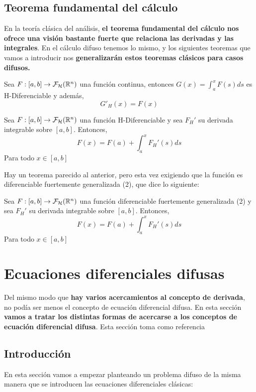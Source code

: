 \subsection{Teorema fundamental del cálculo}
En la teoría clásica del análisis, \textbf{el teorema fundamental del cálculo nos ofrece una visión bastante fuerte que relaciona las derivadas y las integrales}. En el cálculo difuso tenemos lo mismo, y los siguientes teoremas que vamos a introducir nos \textbf{generalizarán estos teoremas clásicos para casos difusos.}

\begin{teorema}
  Sea $F : [a, b] \rightarrow \mathcal{F}_\mathcal{H} (\mathbb R^n)$ una función continua, entonces $G(x) = \int_{a}^{x} F(s) ds$ es H-Diferenciable y además,
  \[
  G'_H(x) = F(x)
  \]
\end{teorema}

\begin{teorema}
  Sea $F : [a, b] \rightarrow  \mathcal{F}_\mathcal{H} (\mathbb R^n)$ una función H-Diferenciable y sea $F_H'$ su derivada integrable sobre $[a, b]$. Entonces,
  \[
  F(x) = F(a) + \int_{a}^{x}F_H'(s) ds
  \]
  Para todo $x \in [a, b]$
\end{teorema}

Hay un teorema parecido al anterior, pero esta vez exigiendo que la función es diferenciable fuertemente generalizada (2), que dice lo siguiente:

\begin{teorema}
  Sea $F : [a, b] \rightarrow  \mathcal{F}_\mathcal{H} (\mathbb R^n)$ una función diferenciable fuertemente generalizada (2) y sea $F_H'$ su derivada integrable sobre $[a, b]$. Entonces,
  \[
  F(x) = F(a) + \int_{a}^{x}F_H'(s) ds
  \]
  Para todo $x \in [a, b]$
\end{teorema}

\section{Ecuaciones diferenciales difusas}
Del mismo modo que \textbf{hay varios acercamientos al concepto de derivada}, no podía ser menos el concepto de ecuación diferencial difusa. En esta sección \textbf{vamos a tratar los distintas formas de acercarse a los conceptos de ecuación diferencial difusa}. Esta sección toma como referencia \cite{fuzzyapproaches}

\subsection{Introducción}
En esta sección vamos a empezar planteando un problema difuso de la misma manera que se introducen las ecuaciones diferenciales clásicas:

